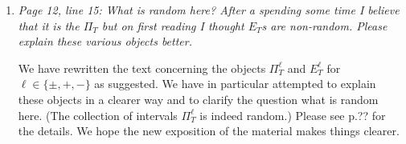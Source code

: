 \documentclass[a4paper,12pt]{article}
\begin{document}
\begin{enumerate}[label=(\arabic*),leftmargin=0.8cm]









\item \textit{Page 12, line 15: What is random here? After a spending some time I believe that it is the $\Pi_T$ but on first reading I thought $E_T$s are non-random. Please explain these various objects better.}

We have rewritten the text concerning the objects $\Pi_T^\ell$ and $E_T^\ell$ for $\ell \in \{\pm,+,-\}$ as suggested. We have in particular attempted to explain these objects in a clearer way and to clarify the question what is random here. (The collection of intervals $\Pi_T^\ell$ is indeed random.) Please see p.?? for the details. We hope the new exposition of the material makes things clearer.  



\end{enumerate}
\end{document}
